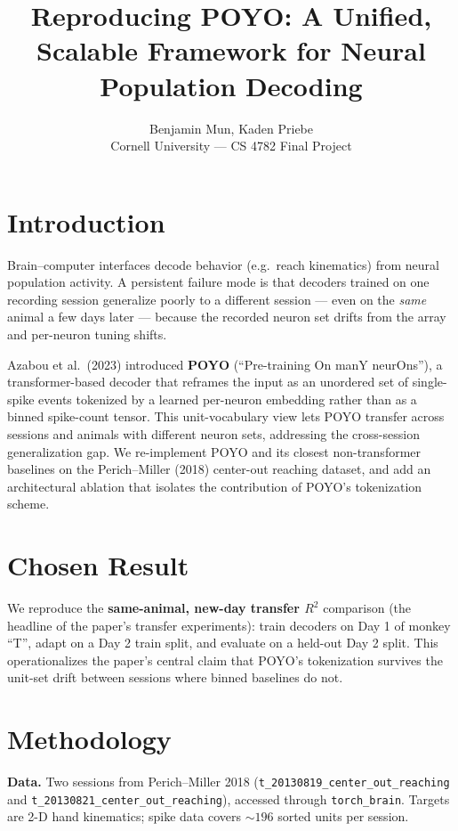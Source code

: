 \documentclass[11pt]{article}
\title{\vspace{-2em}Reproducing POYO: A Unified, Scalable Framework for Neural Population Decoding}
\author{Benjamin Mun, Kaden Priebe \\ Cornell University --- CS 4782 Final Project}
\date{}
\begin{document}
\maketitle
\vspace{-2em}

\section{Introduction}
Brain--computer interfaces decode behavior (e.g.\ reach kinematics) from neural population activity. A persistent failure mode is that decoders trained on one recording session generalize poorly to a different session --- even on the \emph{same} animal a few days later --- because the recorded neuron set drifts from the array and per-neuron tuning shifts.

Azabou et al.\ (2023) introduced \textbf{POYO} (``Pre-training On manY neurOns''), a transformer-based decoder that reframes the input as an unordered set of single-spike events tokenized by a learned per-neuron embedding rather than as a binned spike-count tensor. This unit-vocabulary view lets POYO transfer across sessions and animals with different neuron sets, addressing the cross-session generalization gap. We re-implement POYO and its closest non-transformer baselines on the Perich--Miller (2018) center-out reaching dataset, and add an architectural ablation that isolates the contribution of POYO's tokenization scheme.

\section{Chosen Result}
We reproduce the \textbf{same-animal, new-day transfer $R^2$} comparison (the headline of the paper's transfer experiments): train decoders on Day 1 of monkey ``T'', adapt on a Day 2 train split, and evaluate on a held-out Day 2 split. This operationalizes the paper's central claim that POYO's tokenization survives the unit-set drift between sessions where binned baselines do not.

\section{Methodology}
\textbf{Data.} Two sessions from Perich--Miller 2018 (\texttt{t\_20130819\_center\_out\_reaching} and \texttt{t\_20130821\_center\_out\_reaching}), accessed through \texttt{torch\_brain}. Targets are 2-D hand kinematics; spike data covers ${\sim}196$ sorted units per session.
\end{document}
